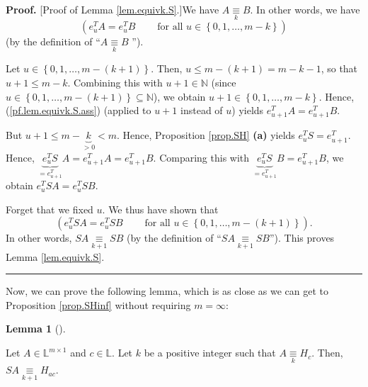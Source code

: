 \documentclass[numbers=enddot,12pt,final,onecolumn,notitlepage]{scrartcl}%
\theoremstyle{definition}
\newtheorem{lem}[theo]{Lemma}
\newenvironment{lemma}[1][]
{\begin{lem}[#1]\begin{leftbar}}
{\end{leftbar}\end{lem}}
\newenvironment{proof}[1][Proof]{\noindent\textbf{#1.} }{\ \rule{0.5em}{0.5em}}
\begin{document}
\begin{proof}
[Proof of Lemma \ref{lem.equivk.S}.]We have $A\underset{k}{\equiv}B$. In other
words, we have%
\begin{equation}
\left(  e_{u}^{T}A=e_{u}^{T}B\ \ \ \ \ \ \ \ \ \ \text{for all }u\in\left\{
0,1,\ldots,m-k\right\}  \right)  \label{pf.lem.equivk.S.ass}%
\end{equation}
(by the definition of \textquotedblleft$A\underset{k}{\equiv}B$%
\textquotedblright).

Let $u\in\left\{  0,1,\ldots,m-\left(  k+1\right)  \right\}  $. Then, $u\leq
m-\left(  k+1\right)  =m-k-1$, so that $u+1\leq m-k$. Combining this with
$u+1\in\mathbb{N}$ (since $u\in\left\{  0,1,\ldots,m-\left(  k+1\right)
\right\}  \subseteq\mathbb{N}$), we obtain $u+1\in\left\{  0,1,\ldots
,m-k\right\}  $. Hence, (\ref{pf.lem.equivk.S.ass}) (applied to $u+1$ instead
of $u$) yields $e_{u+1}^{T}A=e_{u+1}^{T}B$.

But $u+1\leq m-\underbrace{k}_{>0}<m$. Hence, Proposition \ref{prop.SH}
\textbf{(a)} yields $e_{u}^{T}S=e_{u+1}^{T}$. Hence, $\underbrace{e_{u}^{T}%
S}_{=e_{u+1}^{T}}A=e_{u+1}^{T}A=e_{u+1}^{T}B$. Comparing this with
$\underbrace{e_{u}^{T}S}_{=e_{u+1}^{T}}B=e_{u+1}^{T}B$, we obtain $e_{u}%
^{T}SA=e_{u}^{T}SB$.

Forget that we fixed $u$. We thus have shown that%
\[
\left(  e_{u}^{T}SA=e_{u}^{T}SB\ \ \ \ \ \ \ \ \ \ \text{for all }u\in\left\{
0,1,\ldots,m-\left(  k+1\right)  \right\}  \right)  .
\]
In other words, $SA\underset{k+1}{\equiv}SB$ (by the definition of
\textquotedblleft$SA\underset{k+1}{\equiv}SB$\textquotedblright). This proves
Lemma \ref{lem.equivk.S}.
\end{proof}

Now, we can prove the following lemma, which is as close as we can get to
Proposition \ref{prop.SHinf} without requiring $m=\infty$:

\begin{lemma}
\label{lem.equivk.Sc}Let $A\in\mathbb{L}^{m\times1}$ and $c\in\mathbb{L}$. Let
$k$ be a positive integer such that $A\underset{k}{\equiv}H_{c}$. Then,
$SA\underset{k+1}{\equiv}H_{ac}$.
\end{lemma}
\end{document}
